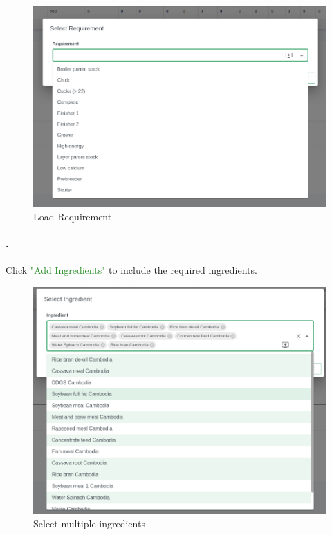 \begin{figure}[h!]
  	\includegraphics[width=15cm]{screenshots/load_requirement.png}
  	\caption{Load Requirement}
  	\label{fig:load_req}
\end{figure}

\paragraph{.} Click \textcolor{ForestGreen}{"Add Ingredients"} to include the required ingredients.

\begin{figure}[h!]
  	\includegraphics[width=15cm]{screenshots/select_ingredients.png}
  	\caption{Select multiple ingredients}
  	\label{fig:select_ing}
\end{figure}

